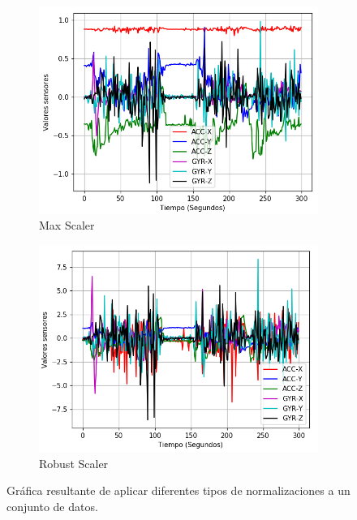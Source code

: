 \begin{figure}
        \begin{subfigure}[h]{0.45\textwidth} 
            \includegraphics[width=\textwidth]{imagenes/Cap3/datos_max_scaler}
            \caption{Max Scaler}
            \label{fig:max}
        \end{subfigure}       
        \begin{subfigure}[h]{0.45\textwidth} 
            \includegraphics[width=\textwidth]{imagenes/Cap3/datos_robust_scaler}
            \caption{Robust Scaler}
            \label{fig:robust}
        \end{subfigure}
        \caption{Gr\'{a}fica resultante de aplicar diferentes tipos de normalizaciones a un conjunto de datos.}
        
		\label{fig:nor_nor}
    \end{figure}


